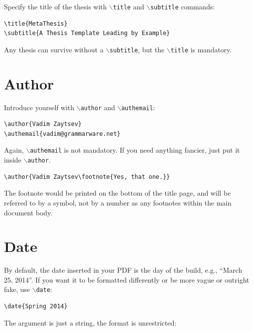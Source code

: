 \documentclass{uvamscse}
\newcommand{\cmd}[1]{\texttt{$\backslash$#1}}
\begin{document}
Specify the title of the thesis with \cmd{title} and \cmd{subtitle} commands:

\begin{snippet}
\begin{verbatim}
\title{MetaThesis}
\subtitle{A Thesis Template Leading by Example}
\end{verbatim}
\end{snippet}

Any thesis can survive without a \cmd{subtitle}, but the \cmd{title} is mandatory.

\section{Author}

Introduce yourself with \cmd{author} and \cmd{authemail}:

\begin{snippet}
\begin{verbatim}
\author{Vadim Zaytsev}
\authemail{vadim@grammarware.net}
\end{verbatim}
\end{snippet}

Again, \cmd{authemail} is not mandatory. If you need anything fancier, just put it inside \cmd{author}.

\begin{snippet}
\begin{verbatim}
\author{Vadim Zaytsev\footnote{Yes, that one.}}
\end{verbatim}
\end{snippet}

The footnote would be printed on the bottom of the title page, and will be
referred to by a symbol, not by a number as any footnotes within the main
document body.

\section{Date}

By default, the date inserted in your PDF is the day of the build, e.g., ``March 25, 2014''. If you want it to be formatted differently or be more vague or outright fake, use \cmd{date}:

\begin{snippet}
\begin{verbatim}
\date{Spring 2014}
\end{verbatim}
\end{snippet}

The argument is just a string, the format is unrestricted:
\end{document}
